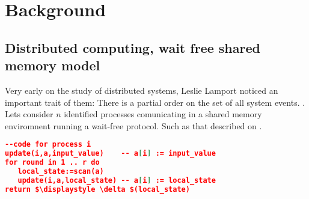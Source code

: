 \documentclass{tufte-book} %
\begin{document}
%





\chapter{Background} %
\section{Distributed computing, wait free shared memory model}

Very early on the study of distributed systems, Leslie Lamport noticed an important trait of them: There is a partial order on the set of all system events. \cite{Lamport78}.\\

Lets consider $n$ identified processes comunicating in a shared memory enviromnent running a wait-free protocol. Such as that described on \cite{Herlihy1999}.\\

\begin{lstlisting}[mathescape,language=json,firstnumber=1,basicstyle=\footnotesize,commentstyle=\color{gray},caption={Normal form wait free protocol},label=amb]
--code for process i 
update(i,a,input_value)    -- a[i] := input_value
for round in 1 .. r do
   local_state:=scan(a)
   update(i,a,local_state) -- a[i] := local_state
return $\displaystyle \delta $(local_state)
\end{lstlisting}
\end{document}
